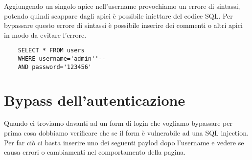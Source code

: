 \documentclass[oneside,a4paper,11pt]{book}
\theoremstyle{italicstyle}
\theoremstyle{normStyle}
\begin{document}
Aggiungendo un singolo apice nell'username provochiamo un errore di sintassi, potendo quindi scappare dagli apici è possibile iniettare del codice SQL. Per bypassare questo errore di sintassi è possibile inserire dei commenti o altri apici in modo da evitare l'errore.

\begin{lstlisting}
    SELECT * FROM users
    WHERE username='admin''--
    AND password='123456'
\end{lstlisting}

\section{Bypass dell'autenticazione}
Quando ci troviamo davanti ad un form di login che vogliamo bypassare per prima cosa dobbiamo verificare che se il form è vulnerabile ad una SQL injection. Per far ciò ci basta inserire uno dei seguenti paylod dopo l'username e vedere se causa errori o cambiamenti nel comportamento della pagina.

\begin{table}[h]
  \centering
  \caption{Payload per scoprire la vulnerabilità}
\end{table}
\end{document}
